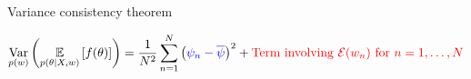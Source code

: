 

    



\begin{frame}[t]{Variance consistency theorem}

%
\begin{align*}
    \underset{p(w)}{\mathrm{Var}}\left(\underset{p(\theta \vert X, w)}{\mathbb{E}}\left[f(\theta)\right]\right)
    = 
    \frac{1}{N^2} \sum_{n=1}^N \left(
        \textcolor{blue}{\psi_n - \overline{\psi}}
    \right)^2 +
    \textcolor{red}{\textrm{Term involving }
        \textcolor{red}{\mathcal{E}}(w_n)
        \textrm{ for }n =1,\dots,N
    }
\end{align*}
%
\def\thetatrue{\theta_{\infty}}
\def\thetahat{\hat\theta}


\def\normdist{\mathcal{N}}

\def\gcovtrue{V^g}
\def\gcovij{V^{\mathrm{IJ}}}


\end{frame}
